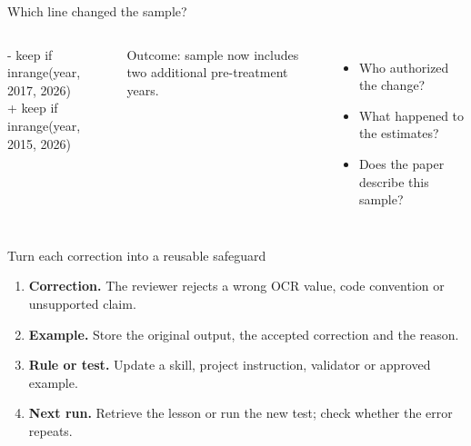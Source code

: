 \begin{frame}{Which line changed the sample?}
\begin{columns}[T,onlytextwidth]
\begin{tcolorbox}[l2base,left=1.6mm,right=1.4mm,top=1.2mm,bottom=1.2mm]
{\color{bad}\ttfamily\footnotesize - keep if inrange(year, 2017, 2026)}\\[0.25em]
{\color{good}\ttfamily\footnotesize + keep if inrange(year, 2015, 2026)}
\end{tcolorbox}
\vspace{0.6em}
Outcome: sample now includes two additional pre-treatment years.
\begin{itemize}\setlength{\itemsep}{0.45em}
\item Who authorized the change?
\item What happened to the estimates?
\item Does the paper describe this sample?
\end{itemize}
\end{columns}
\end{frame}

\begin{frame}{Turn each correction into a reusable safeguard}
\begin{enumerate}\setlength{\itemsep}{0.45em}
\item \textbf{Correction.} The reviewer rejects a wrong OCR value, code convention or unsupported claim.
\item \textbf{Example.} Store the original output, the accepted correction and the reason.
\item \textbf{Rule or test.} Update a skill, project instruction, validator or approved example.
\item \textbf{Next run.} Retrieve the lesson or run the new test; check whether the error repeats.
\end{enumerate}
\end{frame}

